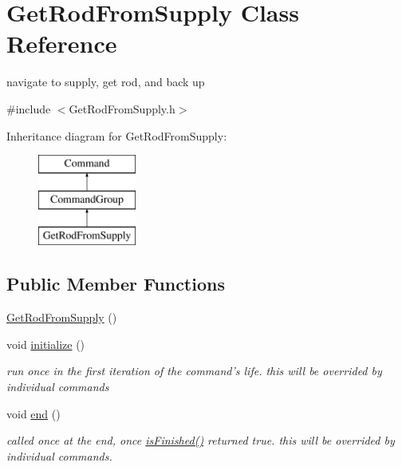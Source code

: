 \hypertarget{classGetRodFromSupply}{\section{Get\-Rod\-From\-Supply Class Reference}
\label{classGetRodFromSupply}
}


navigate to supply, get rod, and back up  




{\ttfamily \#include $<$Get\-Rod\-From\-Supply.\-h$>$}

Inheritance diagram for Get\-Rod\-From\-Supply\-:\begin{figure}[H]
\begin{center}
\leavevmode
\includegraphics[height=3.000000cm]{classGetRodFromSupply}
\end{center}
\end{figure}
\subsection*{Public Member Functions}
\begin{DoxyCompactItemize}
\item 
\hyperlink{classGetRodFromSupply_a8c06b54ce60f0547d4cb68465081c042}{Get\-Rod\-From\-Supply} ()
\item 
void \hyperlink{classGetRodFromSupply_ab843b3e54e3d6c51869453edf0ba1ac3}{initialize} ()
\begin{DoxyCompactList}\small\item\em run once in the first iteration of the command's life. this will be overrided by individual commands \end{DoxyCompactList}\item 
void \hyperlink{classGetRodFromSupply_a6cd4c581c1a6a0aac1ccf6667e532757}{end} ()
\begin{DoxyCompactList}\small\item\em called once at the end, once \hyperlink{classCommandGroup_a96807a2763adf9e21ebf2cb9e3574e3c}{is\-Finished()} returned true. this will be overrided by individual commands. \end{DoxyCompactList}\end{DoxyCompactItemize}
